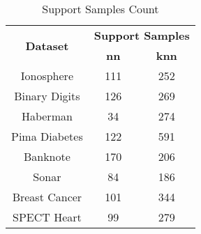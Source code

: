 \begin{table}[htbp]
\caption{Support Samples Count}
\begin{center}
\begin{tabular}{|c|c|c|}
\hline
\multirow{2}{*}{\textbf{Dataset}} & \multicolumn{2}{c|}{\textbf{Support Samples}} \\ \cline{2-3}
 & \textbf{nn} & \textbf{knn} \\ \hline
Ionosphere & 111 & 252 \\ \hline
Binary Digits & 126 & 269 \\ \hline
Haberman & 34 & 274 \\ \hline
Pima Diabetes & 122 & 591 \\ \hline
Banknote & 170 & 206 \\ \hline
Sonar & 84 & 186 \\ \hline
Breast Cancer & 101 & 344 \\ \hline
SPECT Heart & 99 & 279 \\ \hline
\end{tabular}
\label{tab:support}
\end{center}
\end{table}